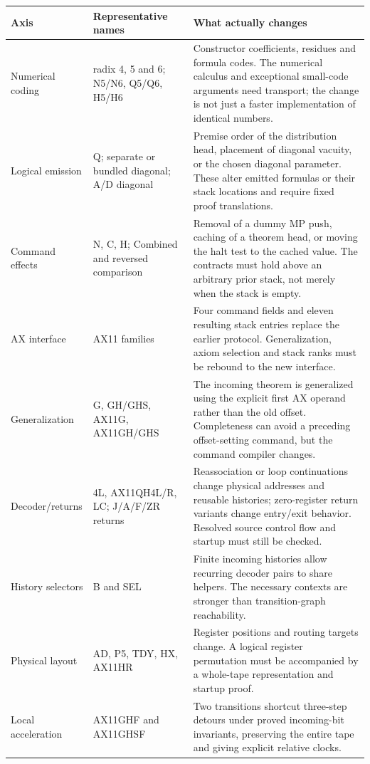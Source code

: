 \begin{longtable}{@{}p{}p{}p{}@{}}
\toprule
Axis & Representative names & What actually changes\\
\midrule\endhead
Numerical coding & radix 4, 5 and 6; N5/N6, Q5/Q6, H5/H6 &
Constructor coefficients, residues and formula codes. The numerical calculus
and exceptional small-code arguments need transport; the change is not just
a faster implementation of identical numbers.\\[4pt]
Logical emission & Q; separate or bundled diagonal; A/D diagonal &
Premise order of the distribution head, placement of diagonal vacuity, or the
chosen diagonal parameter. These alter emitted formulas or their stack
locations and require fixed proof translations.\\[4pt]
Command effects & N, C, H; Combined and reversed comparison &
Removal of a dummy MP push, caching of a theorem head, or moving the halt test
to the cached value. The contracts must hold above an arbitrary prior stack,
not merely when the stack is empty.\\[4pt]
AX interface & AX11 families &
Four command fields and eleven resulting stack entries replace the earlier
protocol. Generalization, axiom selection and stack ranks must be rebound to
the new interface.\\[4pt]
Generalization & G, GH/GHS, AX11G, AX11GH/GHS &
The incoming theorem is generalized using the explicit first AX operand
rather than the old offset. Completeness can avoid a preceding offset-setting
command, but the command compiler changes.\\[4pt]
Decoder/returns & 4L, AX11QH4L/R, LC; J/A/F/ZR returns &
Reassociation or loop continuations change physical addresses and reusable
histories; zero-register return variants change entry/exit behavior. Resolved
source control flow and startup must still be checked.\\[4pt]
History selectors & B and SEL &
Finite incoming histories allow recurring decoder pairs to share helpers.
The necessary contexts are stronger than transition-graph reachability.\\[4pt]
Physical layout & AD, P5, TDY, HX, AX11HR &
Register positions and routing targets change. A logical register permutation
must be accompanied by a whole-tape representation and startup proof.\\[4pt]
Local acceleration & AX11GHF and AX11GHSF &
Two transitions shortcut three-step detours under proved incoming-bit
invariants, preserving the entire tape and giving explicit relative clocks.\\
\bottomrule
\end{longtable}


